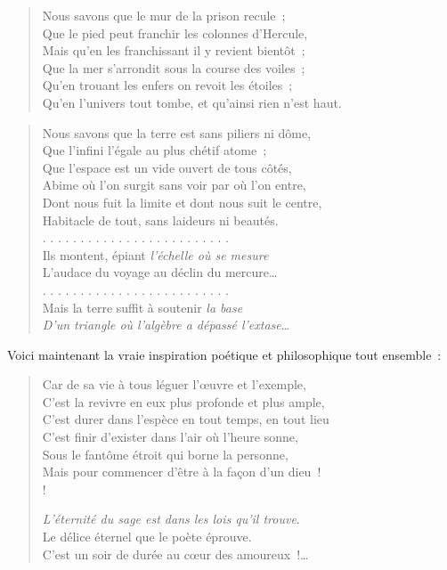 \documentclass[french,twoside]{book} %
\begin{document}
\begin{verse}
Nous savons que le mur de la prison recule ;\\
Que le pied peut franchir les colonnes d’Hercule,\\
Mais qu’en les franchissant il y revient bientôt ;\\
Que la mer s’arrondit sous la course des voiles ;\\
Qu’en trouant les enfers on revoit les étoiles ;\\
Qu’en l’univers tout tombe, et qu’ainsi rien n’est haut.\\
\end{verse}



\begin{verse}
Nous savons que la terre est sans piliers ni dôme,\\
Que l’infini l’égale au plus chétif atome ;\\
Que l’espace est un vide ouvert de tous côtés,\\
Abime où l’on surgit sans voir par où l’on entre,\\
Dont nous fuit la limite et dont nous suit le centre,\\
Habitacle de tout, sans laideurs ni beautés.\\
. . . . . . . . . . . . . . . . . . . . . . . . .\\
Ils montent, épiant \emph{l’échelle où se mesure}\\
L’audace du voyage au déclin du mercure…\\
. . . . . . . . . . . . . . . . . . . . . . . . .\\
Mais la terre suffit à soutenir \emph{la base}\\
\emph{D’un triangle où l’algèbre a dépassé l’extase}…\\
\end{verse}

\noindent Voici maintenant la vraie inspiration poétique et philosophique tout ensemble :\par


\begin{verse}
Car de sa vie à tous léguer l’œuvre et l’exemple,\\
C’est la revivre en eux plus profonde et plus ample,\\
C’est durer dans l’espèce en tout temps, en tout lieu\\
C’est finir d’exister dans l’air où l’heure sonne,\\
Sous le fantôme étroit qui borne la personne,\\
Mais pour commencer d’être à la façon d’un dieu !\\!

\emph{L’éternité du sage est dans les lois qu’il trouve}.\\
Le délice éternel que le poète éprouve.\\
C’est un soir de durée au cœur des amoureux !…\\
\end{verse}
\end{document}

